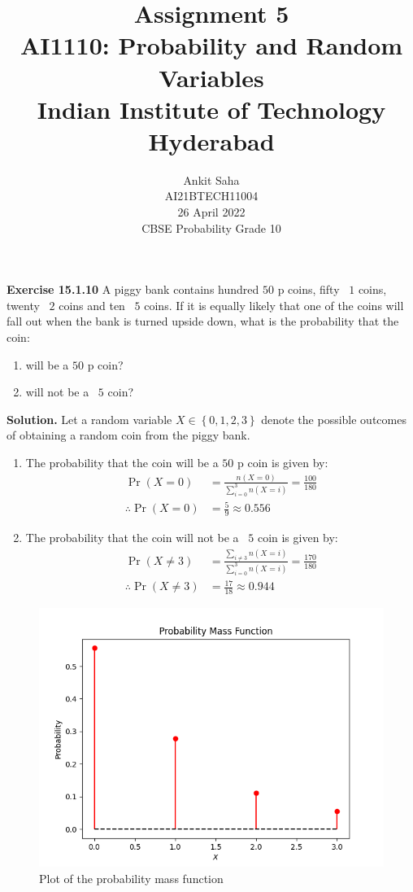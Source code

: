 \documentclass[journal,12pt,twocolumn]{IEEEtran}
\title{Assignment 5 \\ \Large AI1110: Probability and Random Variables \\ \large Indian Institute of Technology Hyderabad}
\author{Ankit Saha \\ \normalsize AI21BTECH11004 \\ \vspace*{20pt} \normalsize  26 April 2022 \\ \vspace*{20pt} \Large CBSE Probability Grade 10}
\providecommand{\pr}[1]{\ensuremath{\Pr\left(#1\right)}}
\providecommand{\cbrak}[1]{\ensuremath{\left\{#1\right\}}}
\begin{document}
	\maketitle
	
	\textbf{Exercise 15.1.10} 
	A piggy bank contains hundred $50$ p coins, fifty \rupee~$1$ coins, twenty \rupee~$2$ coins and ten \rupee~$5$ coins. If it is equally likely that one of the coins will fall out when the bank is turned upside down, what is the probability that the coin:
	\begin{enumerate}[label=(\roman*)]
	\item will be a $50$ p coin?
	\item will not be a \rupee~$5$ coin?
	\end{enumerate}	 
	
	\textbf{Solution.}
	Let a random variable $X \in \cbrak{0,1,2,3}$ denote the possible outcomes of obtaining a random coin from the piggy bank.
	\begin{table}[ht!]
		\centering
		
		\caption{}
		\label{table:table1}	
	\end{table}
	
	\begin{enumerate}[label=(\roman*)]
	\item The probability that the coin will be a $50$ p coin is given by:
	\begin{align}
	\pr{X=0} &= \frac{n(X=0)}{\sum_{i=0}^3 n(X=i)} = \frac{100}{180} \\
	\therefore \pr{X=0} &= \frac{5}{9} \approx 0.556
	\end{align}

	\item The probability that the coin will not be a \rupee~$5$ coin is given by:
	\begin{align}
	\pr{X \ne 3} &= \frac{\sum_{i \ne 3} n(X=i)}{\sum_{i=0}^3 n(X=i)} = \frac{170}{180} \\
	\therefore \pr{X \ne 3} &= \frac{17}{18} \approx 0.944
	\end{align}	
	\end{enumerate}
	
	\begin{figure}[!ht]
		\centering
		\includegraphics[width=\columnwidth]{figs/fig-1.png}
		\caption{Plot of the probability mass function}
		\label{fig1}
	\end{figure}
	
\end{document}

